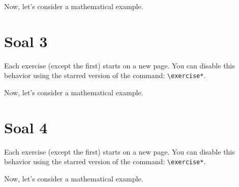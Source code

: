 \documentclass[12pt, a4paper, onecolumn, oneside, final]{report}
\begin{document}
Now, let's consider a mathematical example.

\section*{Soal 3}
Each exercise (except the first) starts on a new page. You can disable this behavior using the starred version of the command: \verb|\exercise*|.

Now, let's consider a mathematical example.

\section*{Soal 4}
Each exercise (except the first) starts on a new page. You can disable this behavior using the starred version of the command: \verb|\exercise*|.

Now, let's consider a mathematical example.

\nocite{*}


\end{document}
